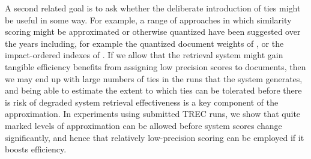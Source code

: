 A second related goal is to ask whether the deliberate introduction
of ties might be useful in some way.
For example, a range of approaches in which similarity scoring might
be approximated or otherwise quantized have been suggested over the
years including, for example
the quantized document weights of {\citet{mzs94ipm}}, or
the impact-ordered indexes of {\citet{am06sigir}}.
If we allow that the retrieval system might gain tangible efficiency
benefits from assigning low precision scores to
documents,
then we may end up with large
numbers of ties in the runs that the system generates,
and being able to estimate the extent to which ties can
be tolerated before there is risk of degraded system retrieval
effectiveness is a key component of the approximation.
In experiments using submitted TREC runs, we show that quite marked
levels of approximation can be allowed before system scores change
significantly, and hence that relatively low-precision scoring can be
employed if it boosts efficiency.

